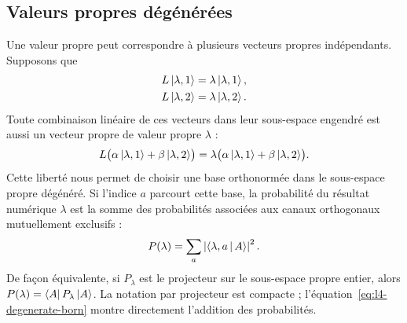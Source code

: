 \begin{classroomqa}
\end{classroomqa}

\begin{classroomqa}
\end{classroomqa}

\subsection{Valeurs propres dégénérées}

Une valeur propre peut correspondre à plusieurs vecteurs propres indépendants. Supposons que
\begin{align}
L\left\lvert\lambda,1\right\rangle&=\lambda\left\lvert\lambda,1\right\rangle,\\
L\left\lvert\lambda,2\right\rangle&=\lambda\left\lvert\lambda,2\right\rangle.
\end{align}
Toute combinaison linéaire de ces vecteurs dans leur sous-espace engendré est aussi un vecteur propre de valeur propre \(\lambda\) :
\begin{equation}
L\bigl(\alpha\left\lvert\lambda,1\right\rangle+\beta\left\lvert\lambda,2\right\rangle\bigr)
=
\lambda\bigl(\alpha\left\lvert\lambda,1\right\rangle+\beta\left\lvert\lambda,2\right\rangle\bigr).
\end{equation}
Cette liberté nous permet de choisir une base orthonormée dans le sous-espace propre dégénéré. Si l’indice \(a\) parcourt cette base, la probabilité du résultat numérique \(\lambda\) est la somme des probabilités associées aux canaux orthogonaux mutuellement exclusifs :
\begin{equation}
P(\lambda)=\sum_a\left|\left\langle\lambda,a\,\middle|\,A\right\rangle\right|^2.
\label{eq:l4-degenerate-born}
\end{equation}
De façon équivalente, si \(P_\lambda\) est le projecteur sur le sous-espace propre entier, alors \(P(\lambda)=\left\langle A\right\rvert P_\lambda\left\lvert A\right\rangle\). La notation par projecteur est compacte ; l’équation~\eqref{eq:l4-degenerate-born} montre directement l’addition des probabilités.

